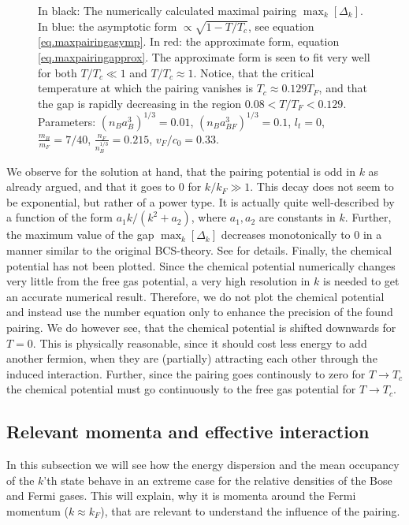 \begin{figure} 
\begin{center}  
  
\caption{In black: The numerically calculated maximal pairing $\max_k[\Delta_k]$. In blue: the asymptotic form $\propto \sqrt{1-T/T_c}$, see equation \eqref{eq.maxpairingasymp}. In red: the approximate form, equation \eqref{eq.maxpairingapprox}. The approximate form is seen to fit very well for both $T/T_c \ll 1$ and $T/T_c \approx 1$. Notice, that the critical temperature at which the pairing vanishes is $T_c \approx 0.129 T_F$, and that the gap is rapidly decreasing in the region $0.08< T/T_F < 0.129$. Parameters: $(n_Ba_B^3)^{1/3} = 0.01$, $(n_Ba_{BF}^3)^{1/3} = 0.1$, $l_t = 0$, $\frac{m_B}{m_F} = 7/40$, $\frac{n_F}{n_B^{1/3}} = 0.215$, $v_F/c_0 = 0.33$. }  
\label{fig.maxkDeltakTdepend}  
\end{center}    
\end{figure}

We observe for the solution at hand, that the pairing potential is odd in $k$ as already argued, and that it goes to 0 for $k/k_F \gg 1$. This decay does not seem to be exponential, but rather of a power type. It is actually quite well-described by a function of the form $a_1k/(k^2 + a_2)$, where $a_1, a_2$ are constants in $k$. Further, the maximum value of the gap $\max_k[\Delta_k]$ decreases monotonically to 0 in a manner similar to the original BCS-theory. See \cite[pp. 63-64]{Tinkham} for details. Finally, the chemical potential has not been plotted. Since the chemical potential numerically changes very little from the free gas potential, a very high resolution in $k$ is needed to get an accurate numerical result. Therefore, we do not plot the chemical potential and instead use the number equation only to enhance the precision of the found pairing. We do however see, that the chemical potential is shifted downwards for $T = 0$. This is physically reasonable, since it should cost less energy to add another fermion, when they are (partially) attracting each other through the induced interaction. Further, since the pairing goes continously to zero for $T\to T_c$ the chemical potential must go continuously to the free gas potential for $T\to T_c$. 


\subsection{Relevant momenta and effective interaction}
\label{subsec.relevantmomenta.effectiveinteraction}
In this subsection we will see how the energy dispersion and the mean occupancy of the $k$'th state behave in an extreme case for the relative densities of the Bose and Fermi gases. This will explain, why it is momenta around the Fermi momentum ($k \approx k_F$), that are relevant to understand the influence of the pairing. 

